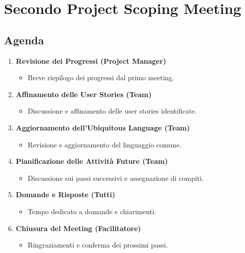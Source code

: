 \section{Secondo Project Scoping Meeting}

\subsection{Agenda}

\begin{enumerate}
    \item \textbf{Revisione dei Progressi (Project Manager)}
          \begin{itemize}
              \item Breve riepilogo dei progressi dal primo meeting.
          \end{itemize}

    \item \textbf{Affinamento delle User Stories (Team)}
          \begin{itemize}
              \item Discussione e affinamento delle user stories identificate.
          \end{itemize}

    \item \textbf{Aggiornamento dell'Ubiquitous Language (Team)}
          \begin{itemize}
              \item Revisione e aggiornamento del linguaggio comune.
          \end{itemize}

    \item \textbf{Pianificazione delle Attività Future (Team)}
          \begin{itemize}
              \item Discussione sui passi successivi e assegnazione di compiti.
          \end{itemize}

    \item \textbf{Domande e Risposte (Tutti)}
          \begin{itemize}
              \item Tempo dedicato a domande e chiarimenti.
          \end{itemize}

    \item \textbf{Chiusura del Meeting (Facilitatore)}
          \begin{itemize}
              \item Ringraziamenti e conferma dei prossimi passi.
          \end{itemize}
\end{enumerate}

